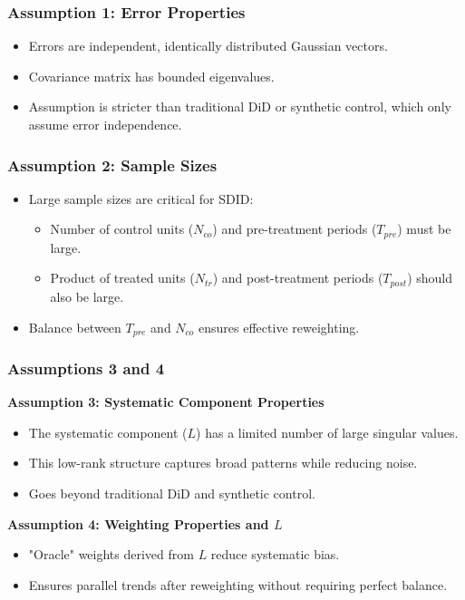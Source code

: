 \documentclass{beamer}
\begin{document}
\begin{frame}
\frametitle{Assumption 1: Error Properties}

\begin{itemize}
    \item Errors are independent, identically distributed Gaussian vectors.
    \item Covariance matrix has bounded eigenvalues.
    \item Assumption is stricter than traditional DiD or synthetic control, which only assume error independence.
\end{itemize}

\end{frame}


\begin{frame}
\frametitle{Assumption 2: Sample Sizes}

\begin{itemize}
    \item Large sample sizes are critical for SDID:
    \begin{itemize}
        \item Number of control units ($N_{co}$) and pre-treatment periods ($T_{pre}$) must be large.
        \item Product of treated units ($N_{tr}$) and post-treatment periods ($T_{post}$) should also be large.
    \end{itemize}
    \item Balance between $T_{pre}$ and $N_{co}$ ensures effective reweighting.
\end{itemize}

\end{frame}


\begin{frame}
\frametitle{Assumptions 3 and 4}

\textbf{Assumption 3: Systematic Component Properties}
\begin{itemize}
    \item The systematic component ($L$) has a limited number of large singular values.
    \item This low-rank structure captures broad patterns while reducing noise.
    \item Goes beyond traditional DiD and synthetic control.
\end{itemize}

\vspace{0.5cm}

\textbf{Assumption 4: Weighting Properties and $L$}
\begin{itemize}
    \item "Oracle" weights derived from $L$ reduce systematic bias.
    \item Ensures parallel trends after reweighting without requiring perfect balance.
\end{itemize}

\end{frame}
\end{document}
